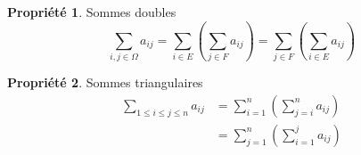 \documentclass[fleqn]{article}
\theoremstyle{definition} \newtheorem*{defi}{D\'efinition}
\theoremstyle{definition} \newtheorem*{theo}{Th\'eor\`eme}
\theoremstyle{definition} \newtheorem*{prop}{Propri\'et\'e}
\begin{document}
\begin{prop} Sommes doubles
	\[\underset{i,j\in \Omega}{\sum} a_{ij} = \underset{i \in E}{\sum}\left(\underset{j \in F}{\sum}a_{ij}\right) =
	\underset{j \in F}{\sum}\left(\underset{i \in E}{\sum}a_{ij}\right)\]
\end{prop}

\begin{prop} Sommes triangulaires
	\begin{align*}
	\underset{1 \leq i \leq j \leq n}{\sum} a_{ij} &= \sum_{i=1}^{n}\left(\sum_{j = i}^n a_{ij}\right) \\
	&= \sum_{j=1}^{n}\left(\sum_{i = 1}^j a_{ij}\right)
	\end{align*}
\end{prop}
\end{document}
